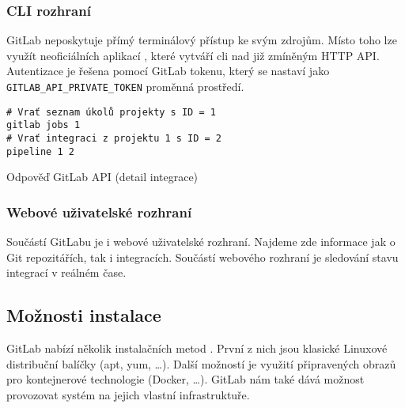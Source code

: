 \subsubsection{CLI rozhraní}

GitLab neposkytuje přímý terminálový přístup ke svým zdrojům.
Místo toho lze využít neoficiálních aplikací \cite{gitlab_cli}, které vytváří cli  nad již zmíněným HTTP API.
Autentizace je řešena pomocí GitLab tokenu, který se nastaví jako \verb|GITLAB_API_PRIVATE_TOKEN| proměnná prostředí.

\begin{listing}[ht]
\begin{verbatim}
# Vrať seznam úkolů projekty s ID = 1
gitlab jobs 1
# Vrať integraci z projektu 1 s ID = 2
pipeline 1 2
\end{verbatim}
\label{code:gitlab-api}
\caption{Odpověď GitLab API (detail integrace)}
\end{listing}

\subsubsection{Webové uživatelské rozhraní}

Součástí GitLabu je i webové uživatelské rozhraní.
Najdeme zde informace jak o Git repozitářích, tak i integracích.
Součástí webového rozhraní je sledování stavu integrací v reálném čase.


\subsection{Možnosti instalace}

GitLab nabízí několik instalačních metod \cite{gitlab_install}.
První z nich jsou klasické Linuxové distribuční balíčky (apt, yum, \ldots).
Další možností je využití připravených obrazů pro kontejnerové technologie (Docker, \ldots).
GitLab nám také dává možnost provozovat systém na jejich vlastní infrastruktuře.

